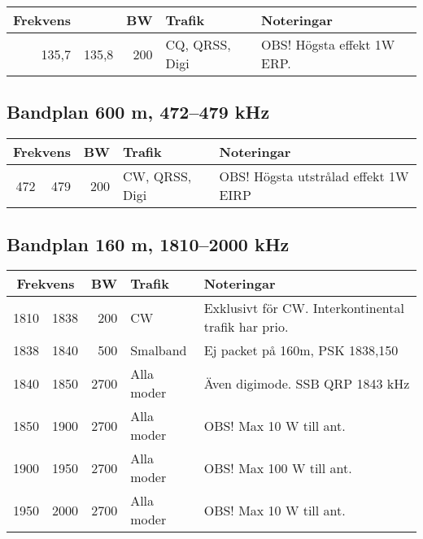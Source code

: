 \begin{tabular}{rrrll}
\textbf{Frekvens} &  & \textbf{BW} & \textbf{Trafik} & \textbf{Noteringar} \\ \hline
135,7 & 135,8 & 200 & CQ, QRSS, Digi & OBS! Högsta effekt 1W ERP. \\ \hline
\end{tabular}

\subsection{Bandplan 600 m, 472--479 kHz}
\begin{tabular}{rrrll}
\multicolumn{2}{c}{\textbf{Frekvens}} & \textbf{BW} & \textbf{Trafik} & \textbf{Noteringar} \\ \hline
472 & 479 & 200 & CW, QRSS, Digi & OBS! Högsta utstrålad effekt 1W EIRP \\ \hline
\end{tabular}

\subsection{Bandplan 160 m, 1810--2000 kHz}
\begin{tabular}{rrrll}
\multicolumn{2}{c}{\textbf{Frekvens}} & \textbf{BW} & \textbf{Trafik} & \textbf{Noteringar} \\ \hline
1810 & 1838 & 200  & CW         & Exklusivt för CW. Interkontinental trafik har prio. \\ \hline
1838 & 1840 & 500  & Smalband   & Ej packet på 160m, PSK 1838,150                    \\ \hline
1840 & 1850 & 2700 & Alla moder & Även digimode. SSB QRP 1843 kHz                    \\ \hline
1850 & 1900 & 2700 & Alla moder & OBS! Max 10 W till ant.                             \\ \hline
1900 & 1950 & 2700 & Alla moder & OBS! Max 100 W till ant.                            \\ \hline
1950 & 2000 & 2700 & Alla moder & OBS! Max 10 W till ant.                             \\ \hline
\end{tabular}

